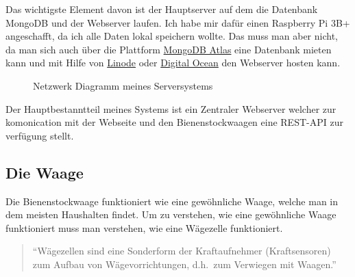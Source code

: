 \documentclass[a4paper, ngerman, 11pt]{scrartcl}
\begin{document}
Das wichtigste Element davon ist der Hauptserver auf dem die Datenbank MongoDB und der Webserver laufen.
Ich habe mir dafür einen Raspberry Pi 3B+ angeschafft, da ich alle Daten lokal speichern wollte.
Das muss man aber nicht, da man sich auch über die Plattform \href{https://www.mongodb.com/cloud/atlas}{MongoDB Atlas} eine Datenbank mieten kann und mit Hilfe von \href{https://www.linode.com}{Linode} oder \href{https://www.digitalocean.com/}{Digital Ocean} den Webserver hosten kann.

\begin{figure}[ht]
	\centering
	\caption{Netzwerk Diagramm meines Serversystems\label{abb:networkdiagram}}
\end{figure}

Der Hauptbestanntteil meines Systems ist ein Zentraler Webserver welcher zur komonication mit der Webseite und den Bienenstockwaagen eine REST-API zur verfügung stellt.

\subsection{Die Waage}

Die Bienenstockwaage funktioniert wie eine gewöhnliche Waage, welche man in dem meisten Haushalten findet.
Um zu verstehen, wie eine gewöhnliche Waage funktioniert muss man verstehen, wie eine Wägezelle funktioniert.

\begin{quote}
	\enquote{Wägezellen sind eine Sonderform der Kraftaufnehmer (Kraftsensoren) zum Aufbau von Wägevorrichtungen, d.h.\ zum Verwiegen mit Waagen.}~\autocite[vgl.][]{WikiWaegezelle}
\end{quote}
\end{document}
